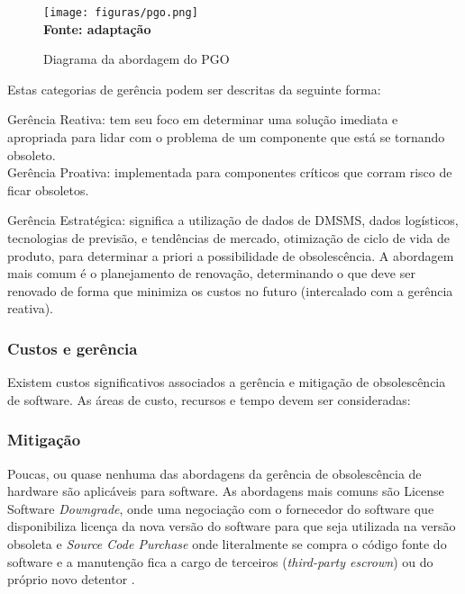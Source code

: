 \begin{figure}[ht]
	\centering	
	\caption[\hspace{0.1cm}PGO.]{Diagrama da abordagem do PGO}
	\vspace{-0.4cm}
	\texttt{[image: figuras/pgo.png]}
	\vspace{-0.2cm}
	\\\textbf{\footnotesize Fonte: \cite{sandborn2008} adaptação }	
	\label{fig:figurapgo}
\end{figure}
\vspace{-0.5cm}

Estas categorias de gerência podem ser descritas da seguinte forma: \cite{sandborn2012}

Gerência Reativa: tem seu foco em determinar uma solução imediata e apropriada para lidar com o problema de um componente que está se tornando obsoleto.\\

Gerência Proativa: implementada para componentes críticos que corram risco de ficar obsoletos.

Gerência Estratégica: significa a utilização de dados de DMSMS, dados logísticos, tecnologias de previsão, e tendências de mercado, otimização de ciclo de vida de produto, para determinar a priori a possibilidade de obsolescência. A abordagem mais comum é o planejamento de renovação, determinando o que deve ser renovado de forma que minimiza os custos no futuro (intercalado com a gerência reativa).

\subsubsection{\esp Custos e gerência}

Existem custos significativos associados a gerência e mitigação de obsolescência de software. As áreas de custo, recursos e tempo devem ser consideradas:

\subsubsection{\esp Mitigação}

Poucas, ou quase nenhuma das abordagens da gerência de obsolescência de hardware são aplicáveis para software. As abordagens mais comuns são License Software \textit{Downgrade}, onde uma negociação com o fornecedor do software que disponibiliza licença da nova versão do software para que seja utilizada na versão obsoleta e \textit{Source Code Purchase} onde literalmente se compra o código fonte do software e a manutenção fica a cargo de terceiros (\textit{third-party escrown}) ou do próprio novo detentor \cite{sandborn2007}. 

